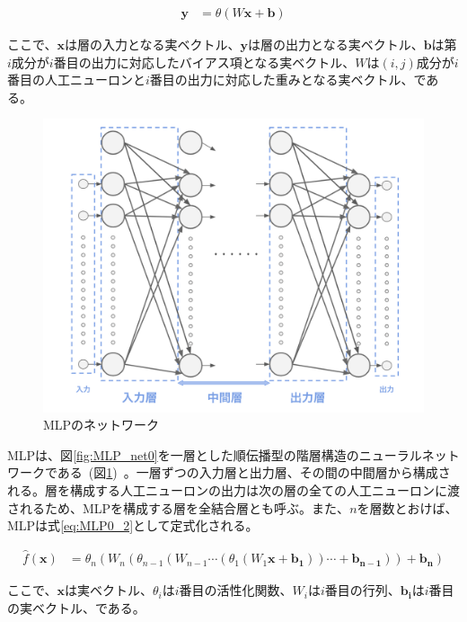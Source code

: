 \begin{align}
    \label{eq:MLP0_1}
    \boldsymbol{y}&=\theta(W\boldsymbol{x}+\boldsymbol{b})
\end{align}

ここで、$\boldsymbol{x}$は層の入力となる実ベクトル、$\boldsymbol{y}$は層の出力となる実ベクトル、$\boldsymbol{b}$は第$i$成分が$i$番目の出力に対応したバイアス項となる実ベクトル、$W$は$(i,j)$成分が$i$番目の人工ニューロンと$i$番目の出力に対応した重みとなる実ベクトル、である。

\begin{figure}[b]
\begin{center}
\includegraphics[width=0.8\hsize]{figure/mlp_net1.png}
\caption{MLPのネットワーク}
\label{fig:MLP_net1}
\end{center}
\end{figure}

MLPは、図\ref{fig:MLP_net0}を一層とした順伝播型の階層構造のニューラルネットワークである~(図\ref{fig:MLP_net1})~。一層ずつの入力層と出力層、その間の中間層から構成される。層を構成する人工ニューロンの出力は次の層の全ての人工ニューロンに渡されるため、MLPを構成する層を全結合層とも呼ぶ。また、$n$を層数とおけば、MLPは式\ref{eq:MLP0_2}として定式化される。

\begin{align}
    \label{eq:MLP0_2}
    \hat{f}(\boldsymbol{x})&=\theta_{n}(W_{n}(\theta_{n-1}(W_{n-1}\cdots(\theta_{1}(W_{1}\boldsymbol{x}+\boldsymbol{b_{1}}))\cdots+\boldsymbol{b_{n-1}}))+\boldsymbol{b_{n}})
\end{align}

ここで、$\boldsymbol{x}$は実ベクトル、$\theta_{i}$は$i$番目の活性化関数、$W_{i}$は$i$番目の行列、$\boldsymbol{b_{i}}$は$i$番目の実ベクトル、である。

